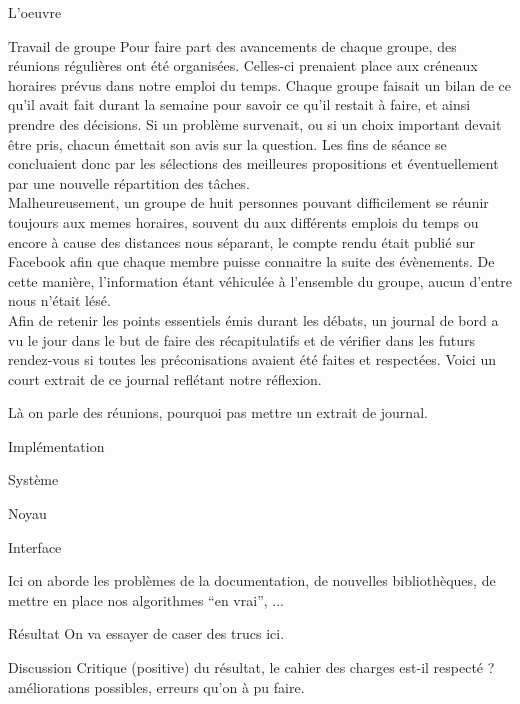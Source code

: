 \documentclass[a4paper, 12pt]{report}
\begin{document}
	\begin{part}{L'oeuvre}
		\begin{chapter}{Travail de groupe}
		Pour faire part des avancements de chaque groupe, des réunions régulières ont été organisées. 
		Celles-ci prenaient place aux créneaux horaires prévus dans notre emploi du temps. 
		Chaque groupe faisait un bilan de ce qu'il avait fait durant la semaine pour savoir ce qu'il restait à faire, et ainsi prendre des décisions.
		Si un problème survenait, ou si un choix important devait être pris, chacun	émettait son avis sur la question.
		Les fins de séance se concluaient donc par les sélections des meilleures propositions et éventuellement par	une nouvelle répartition 
		des tâches.\\
		Malheureusement, un groupe de huit personnes pouvant difficilement se réunir toujours aux memes horaires, 
		souvent du aux différents emplois du temps ou encore à cause des distances nous séparant, le compte rendu était publié sur Facebook 
		afin que chaque membre puisse connaitre la suite des évènements. 
		De cette manière, l'information étant véhiculée à l'ensemble du groupe, aucun d'entre nous n'était lésé.\\
		Afin de retenir les points essentiels émis durant les débats, un journal de bord a vu le jour dans le but de faire des récapitulatifs 
		et de vérifier dans les futurs rendez-vous si toutes les préconisations avaient été faites et respectées. 
		Voici un court extrait de ce journal reflétant notre réflexion.
		
			Là on parle des réunions, pourquoi pas mettre un extrait de journal.
			
		\end{chapter}
		\begin{chapter}{Implémentation}
			\begin{section}{Système}
				
			\end{section}
			\begin{section}{Noyau}
			\end{section}
			\begin{section}{Interface}
			\end{section}
			Ici on aborde les problèmes de la documentation, de nouvelles bibliothèques, de mettre en place nos algorithmes ``en vrai'', ... 
		\end{chapter}
		\begin{chapter}{Résultat}
			On va essayer de caser des trucs ici.
		\end{chapter}
		\begin{chapter}{Discussion}
			Critique (positive) du résultat, le cahier des charges est-il respecté ? améliorations possibles, erreurs qu'on à pu faire.
		\end{chapter}
	\end{part}
\end{document}
